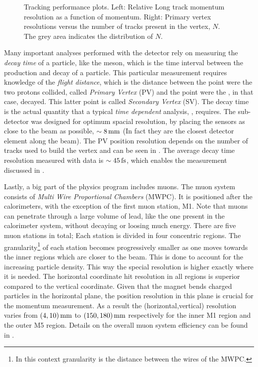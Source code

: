 \begin{figure}[t]
\begin{subfigure}{0.5\textwidth}
    \caption{}
    \label{det_velo_pv_res}
  \end{subfigure}
  \caption{Tracking performance plots. Left: Relative Long track momentum resolution as a function of momentum.
          Right: Primary vertex resolutions versus the number of tracks present in the vertex, $N$. The grey area
          indicates the distribution of $N$.}
  \label{det_velo_perf}
\end{figure}

Many important analyses performed with the \lhcb detector rely on measuring the {\it decay time} of a particle,
like the \Bs meson, which is the time interval between the production and decay of a particle.
This particular measurement requires knowledge of the {\it flight distance}, which is the
distance between the point were the two protons collided, called {\it Primary Vertex} (PV) and the point were the
\Bs, in that case, decayed. This latter point is called {\it Secondary Vertex} (SV). The decay time is the actual
quantity that a typical {\it time dependent} analysis, \eg \BsJpsiPhi, requires.
The \velo sub-detector was designed for optimum spacial resolution, by placing the \velo sensors as close to the beam
as possible, $\sim 8 \rm \,mm$ (In fact they are the closest detector element along the \lhc beam).
The PV position resolution depends on the number of tracks used to build the vertex and can
be seen in . The average decay time resolution measured with \BsJpsiPhi data is $\sim 45\rm \,fs$,
which enables the \phis measurement discussed in .

Lastly, a big part of the \lhcb physics program includes muons. The muon system consists of {\it Multi Wire Proportional Chambers}
(MWPC). It is positioned after the calorimeters, with the exception of the first muon station, M1.
Note that muons can penetrate through a large volume of lead, like the one present in the calorimeter system,
without decaying or loosing much energy. There are five muon stations in total; Each station is divided in four concentric
regions. The granularity\footnote{In this context granularity is the distance between the wires of the MWPC.}
of each station becomes progressively smaller as one moves towards the inner regions which are closer to the beam.
This is done to account for the increasing particle density. This way the special resolution is higher exactly where
it is needed. The horizontal coordinate hit resolution in all regions is superior compared to the vertical coordinate.
Given that the \lhcb magnet bends charged particles in the horizontal plane, the position resolution in this plane
is crucial for the momentum measurement. As a result the (horizontal,vertical) resolution varies from $(4,10)\rm \,mm$ to
$(150,180)\rm \,mm$ respectively for the inner M1 region and the outer M5 region. Details on the overall muon system
efficiency can be found in \cite{AlvesJr:1492807}.
